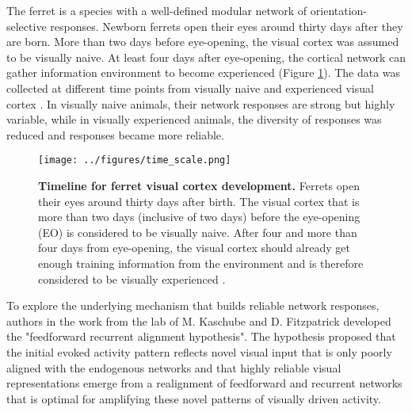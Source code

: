 \documentclass[11pt]{article}
\begin{document}
	The ferret is a species with a well-defined modular network of orientation-selective responses. Newborn ferrets open their eyes around thirty days after they are born. More than two days before eye-opening, the visual cortex was assumed to be visually naive. At least four days after eye-opening, the cortical network can gather information environment to become experienced (Figure \ref{fig:ferret_V1_timescale}). The data was collected at different time points from visually naive and experienced visual cortex \cite[Figure 1a]{tragenap2023nature}. In visually naive animals, their network responses are strong but highly variable, while in visually experienced animals, the diversity of responses was reduced and responses became more reliable. 
	\begin{figure}
		\centering
		\texttt{[image: ../figures/time\_scale.png]}
		\caption[Timeline of ferret visual cortex development]{\textbf{Timeline for ferret visual cortex development.} Ferrets open their eyes around thirty days after birth. The visual cortex that is more than two days (inclusive of two days) before the eye-opening (EO) is considered to be visually naive. After four and more than four days from eye-opening, the visual cortex should already get enough training information from the environment and is therefore considered to be visually experienced \cite{tragenap2023nature}.}
		\label{fig:ferret_V1_timescale}
	\end{figure}
	
	To explore the underlying mechanism that builds reliable network responses, authors in the work from the lab of M. Kaschube and D. Fitzpatrick \cite{tragenap2023nature} developed the "feedforward recurrent alignment hypothesis". The hypothesis proposed that the initial evoked activity pattern reflects novel visual input that is only poorly aligned with the endogenous networks and that highly reliable visual representations emerge from a realignment of feedforward and recurrent networks that is optimal for amplifying these novel patterns of visually driven activity. 
	
\end{document}
